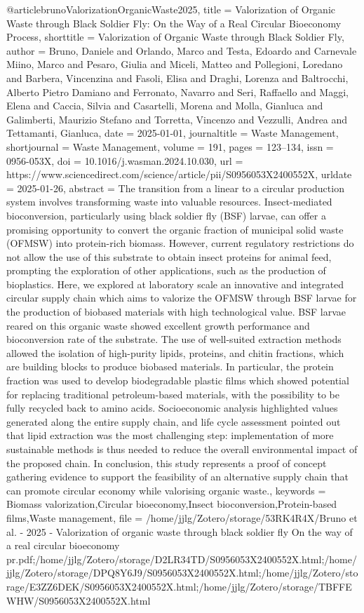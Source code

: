 {{{@article{brunoValorizationOrganicWaste2025,
  title = {Valorization of Organic Waste through Black Soldier Fly: {{On}} the Way of a Real Circular Bioeconomy Process},
  shorttitle = {Valorization of Organic Waste through Black Soldier Fly},
  author = {Bruno, Daniele and Orlando, Marco and Testa, Edoardo and Carnevale Miino, Marco and Pesaro, Giulia and Miceli, Matteo and Pollegioni, Loredano and Barbera, Vincenzina and Fasoli, Elisa and Draghi, Lorenza and Baltrocchi, Alberto Pietro Damiano and Ferronato, Navarro and Seri, Raffaello and Maggi, Elena and Caccia, Silvia and Casartelli, Morena and Molla, Gianluca and Galimberti, Maurizio Stefano and Torretta, Vincenzo and Vezzulli, Andrea and Tettamanti, Gianluca},
  date = {2025-01-01},
  journaltitle = {Waste Management},
  shortjournal = {Waste Management},
  volume = {191},
  pages = {123--134},
  issn = {0956-053X},
  doi = {10.1016/j.wasman.2024.10.030},
  url = {https://www.sciencedirect.com/science/article/pii/S0956053X2400552X},
  urldate = {2025-01-26},
  abstract = {The transition from a linear to a circular production system involves transforming waste into valuable resources. Insect-mediated bioconversion, particularly using black soldier fly (BSF) larvae, can offer a promising opportunity to convert the organic fraction of municipal solid waste (OFMSW) into protein-rich biomass. However, current regulatory restrictions do not allow the use of this substrate to obtain insect proteins for animal feed, prompting the exploration of other applications, such as the production of bioplastics. Here, we explored at laboratory scale an innovative and integrated circular supply chain which aims to valorize the OFMSW through BSF larvae for the production of biobased materials with high technological value. BSF larvae reared on this organic waste showed excellent growth performance and bioconversion rate of the substrate. The use of well-suited extraction methods allowed the isolation of high-purity lipids, proteins, and chitin fractions, which are building blocks to produce biobased materials. In particular, the protein fraction was used to develop biodegradable plastic films which showed potential for replacing traditional petroleum-based materials, with the possibility to be fully recycled back to amino acids. Socioeconomic analysis highlighted values generated along the entire supply chain, and life cycle assessment pointed out that lipid extraction was the most challenging step: implementation of more sustainable methods is thus needed to reduce the overall environmental impact of the proposed chain. In conclusion, this study represents a proof of concept gathering evidence to support the feasibility of an alternative supply chain that can promote circular economy while valorising organic waste.},
  keywords = {Biomass valorization,Circular bioeconomy,Insect bioconversion,Protein-based films,Waste management},
  file = {/home/jjlg/Zotero/storage/53RK4R4X/Bruno et al. - 2025 - Valorization of organic waste through black soldier fly On the way of a real circular bioeconomy pr.pdf;/home/jjlg/Zotero/storage/D2LR34TD/S0956053X2400552X.html;/home/jjlg/Zotero/storage/DPQ8Y6J9/S0956053X2400552X.html;/home/jjlg/Zotero/storage/E3ZZ6DEK/S0956053X2400552X.html;/home/jjlg/Zotero/storage/TBFFEWHW/S0956053X2400552X.html}
}

}}}
